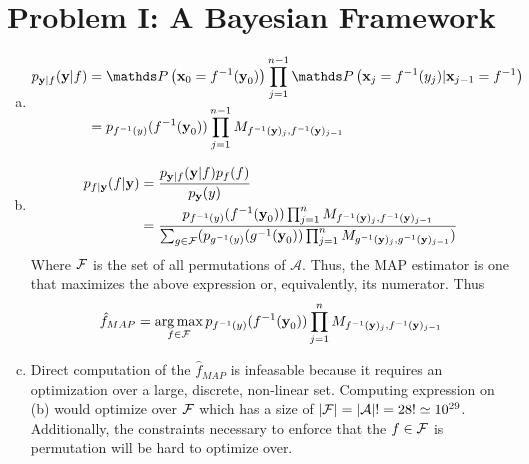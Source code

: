 \documentclass{siamart190516}
\begin{document}
\maketitle

\section*{Problem I: A Bayesian Framework}
\label{sec:bayesian}


\begin{enumerate}[(a)]

  \item \begin{align*}
          p_{\textbf{y}|f}(\textbf{y}|f) & = \prob{ \textbf{x}_0 = \inv{f}(\textbf{y}_0)} \prod_{j = 1}^{n-1} \prob{\textbf{x}_j = \inv{f}(y_j) | \textbf{x}_{j-1} = \inv{f}} \\
                                         & = p_{\inv{f}(y)}(\inv{f}(\textbf{y}_0)) \prod_{j = 1}^{n-1} M_{\inv{f}(\textbf{y})_{j}, \inv{f}(\textbf{y})_{j-1}}
        \end{align*}

  \item \begin{align*}
          p_{f|\textbf{y}}(f | \textbf{y}) & = \frac{ p_{\textbf{y}|f}(\textbf{y}|f) p_{f}(f) }{p_\textbf{y}(y)}                                                                                                                                                                                  \\
                                           & = \frac{p_{f^{-1}(y)}(f^{-1}(\textbf{y}_0)) \prod_{j = 1}^n M_{f^{-1}(\textbf{y})_{j}, f^{-1}(\textbf{y})_{j-1}}}{\sum_{g \in \mathcal{F}}(p_{g^{-1}(y)}(g^{-1}(\textbf{y}_0)) \prod_{j = 1}^n M_{g^{-1}(\textbf{y})_{j}, g^{-1}(\textbf{y})_{j-1}})}
        \end{align*}
        Where $\mathcal{F}$ is the set of all permutations of $\mathcal{A}$. Thus, the MAP estimator is one that maximizes the above expression or, equivalently, its numerator. Thus
        \[
          \hat{f}_{MAP} = \operatorname*{arg\,max}_{f \in \mathcal{F}} p_{f^{-1}(y)}(f^{-1}(\textbf{y}_0)) \prod_{j = 1}^n M_{f^{-1}(\textbf{y})_{j}, f^{-1}(\textbf{y})_{j-1}}
        \]

  \item Direct computation of the $\hat{f}_{MAP}$ is infeasable because it requires an optimization over a large, discrete, non-linear set. Computing expression on (b) would optimize over $\mathcal{F}$ which has a size of $\left| \mathcal{F} \right| = \left| \mathcal{A} \right|! = 28! \simeq 10^{29}$. Additionally, the constraints necessary to enforce that the $f \in \mathcal{F}$ is permutation will be hard to optimize over.
\end{enumerate}
\end{document}

